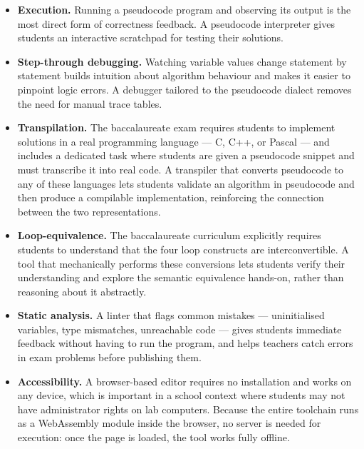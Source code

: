 \begin{itemize}
  \item \textbf{Execution.}  Running a pseudocode program and observing its
        output is the most direct form of correctness feedback.  A pseudocode
        interpreter gives students an interactive scratchpad for testing their
        solutions.

  \item \textbf{Step-through debugging.}  Watching variable values change
        statement by statement builds intuition about algorithm behaviour and
        makes it easier to pinpoint logic errors.  A debugger tailored to the
        pseudocode dialect removes the need for manual trace tables.

  \item \textbf{Transpilation.}  The baccalaureate exam requires students
        to implement solutions in a real programming language --- C, C++,
        or Pascal --- and includes a dedicated task where students are given
        a pseudocode snippet and must transcribe it into real code.  A
        transpiler that converts pseudocode to any of these languages lets
        students validate an algorithm in pseudocode and then produce a
        compilable implementation, reinforcing the connection between the
        two representations.

  \item \textbf{Loop-equivalence.}  The baccalaureate curriculum explicitly
        requires students to understand that the four loop constructs are
        interconvertible.  A tool that mechanically performs these conversions
        lets students verify their understanding and explore the semantic
        equivalence hands-on, rather than reasoning about it abstractly.

  \item \textbf{Static analysis.}  A linter that flags common mistakes ---
        uninitialised variables, type mismatches, unreachable code --- gives
        students immediate feedback without having to run the program, and
        helps teachers catch errors in exam problems before publishing them.

  \item \textbf{Accessibility.}  A browser-based editor requires no
        installation and works on any device, which is important in a school
        context where students may not have administrator rights on lab
        computers.  Because the entire toolchain runs as a WebAssembly module
        inside the browser, no server is needed for execution: once the page
        is loaded, the tool works fully offline.
\end{itemize}

